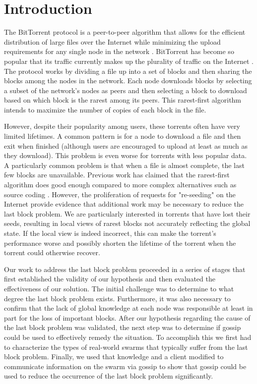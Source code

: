 \section{Introduction}

The BitTorrent protocol is a peer-to-peer algorithm that allows for the
efficient distribution of large files over the Internet while minimizing
the upload requirements for any single node in the network \cite{bep003}. BitTorrent
has become so popular that its traffic currently makes up the plurality
of traffic on the Internet \cite{istudy08}. The protocol works by dividing a file
up into a set of blocks and then sharing the blocks among the nodes in
the network. Each node downloads blocks by selecting a subset of the
network's nodes as peers and then selecting a block to download based on
which block is the rarest among its peers. This rarest-first algorithm
intends to maximize the number of copies of each block in the file.


However, despite their popularity among users, these torrents
often have very limited lifetimes. A common pattern is for a node
to download a file and then exit when finished (although users are
encouraged to upload at least as much as they download). This problem
is even worse for torrents with less popular data. A particularly
common problem is that when a file is almost complete, the last
few blocks are unavailable. Previous work has claimed that the
rarest-first algorithm does good enough compared to more complex
alternatives such as source coding \cite{legout:1}. However, the proliferation
of requests for "re-seeding" on the Internet provide evidence that
additional work may be necessary to reduce the last block problem. We
are particularly interested in torrents that have lost their seeds,
resulting in local views of rarest blocks not accurately reflecting
the global state. If the local view is indeed incorrect, this can
make the torrent's performance worse and possibly shorten the lifetime
of the torrent when the torrent could otherwise recover.


Our work to address the last block problem proceeded in a series of stages
that first established the validity of our hypothesis and then evaluated
the effectiveness of our solution. The initial challenge was to determine
to what degree the last block problem exists. Furthermore,  it was also
necessary to confirm that the lack of global knowledge at each node was
responsible at least in part for the loss of important blocks. After our
hypothesis regarding the cause of the last block problem was validated,
the next step was to determine if gossip could be used to effectively
remedy the situation. To accomplish this we first had to characterize
the types of real-world swarms that typically suffer from the last
block problem. Finally, we used that knowledge and a client modified to
communicate information on the swarm via gossip to show that gossip could
be used to reduce the occurrence of the last block problem significantly.


